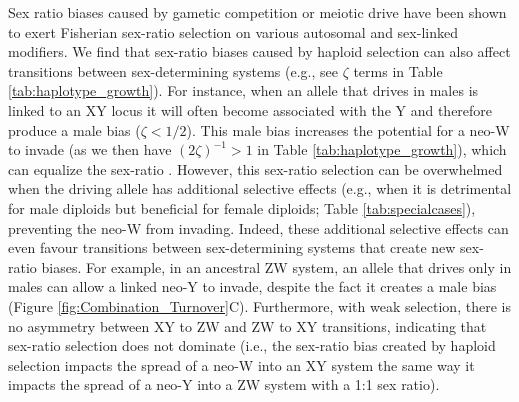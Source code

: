 \documentclass[12pt]{article}
\begin{document}

Sex ratio biases caused by gametic competition or meiotic drive have been shown to exert Fisherian sex-ratio selection on various autosomal \citep{Stalker:1961th,Smith:1975ft,Frank:1989vl,Hough:2013uo,Ubeda:2015fx, Otto:2015va} and sex-linked \citep{Ubeda:2015fx} modifiers.
We find that sex-ratio biases caused by haploid selection can also affect transitions between sex-determining systems (e.g., see $\zeta$ terms in Table \ref{tab:haplotype_growth}). 
For instance, when an allele that drives in males is linked to an XY locus it will often become associated with the Y and therefore produce a male bias ($\zeta<1/2$).
This male bias increases the potential for a neo-W to invade (as we then have $(2\zeta)^{-1}>1$ in Table \ref{tab:haplotype_growth}), which can equalize the sex-ratio \citep[for a related example see][]{Ubeda:2015fx}.
However, this sex-ratio selection can be overwhelmed when the driving allele has additional selective effects (e.g., when it is detrimental for male diploids but beneficial for female diploids; Table \ref{tab:specialcases}), preventing the neo-W from invading. %
Indeed, these additional selective effects can even favour transitions between sex-determining systems that create new sex-ratio biases.
For example, in an ancestral ZW system, an allele that drives only in males can allow a linked neo-Y to invade, despite the fact it creates a male bias (Figure \ref{fig:Combination_Turnover}C).
Furthermore, with weak selection, there is no asymmetry between XY to ZW and ZW to XY transitions, indicating that sex-ratio selection does not dominate (i.e., the sex-ratio bias created by haploid selection impacts the spread of a neo-W into an XY system the same way it impacts the spread of a neo-Y into a ZW system with a 1:1 sex ratio). 
\end{document}
